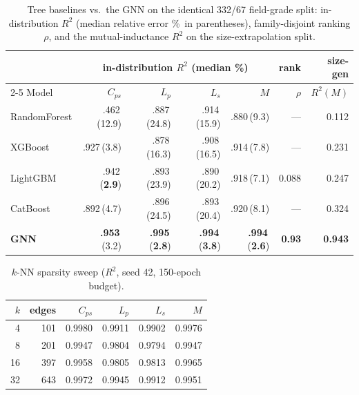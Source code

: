 \documentclass[letterpaper,twocolumn,9pt]{extarticle}
\begin{document}
\begin{table}[t]
\caption{Tree baselines vs.\ the GNN on the identical 332/67 field-grade split:
in-distribution $R^2$ (median relative error \%\ in parentheses), family-disjoint
ranking $\rho$, and the mutual-inductance $R^2$ on the size-extrapolation split.}
\label{tab:trees}
\centering
\footnotesize
\setlength{\tabcolsep}{3.5pt}
\begin{tabular}{lrrrr@{\ \ }rr}
\toprule
& \multicolumn{4}{c}{in-distribution $R^2$ (median \%)} & rank & size-gen\\
\cmidrule(lr){2-5}
Model & $C_{ps}$ & $L_{p}$ & $L_{s}$ & $M$ & $\rho$ & $R^2(M)$\\
\midrule
RandomForest & .462\,(12.9) & .887\,(24.8) & .914\,(15.9) & .880\,(9.3) & --- & 0.112\\
XGBoost      & .927\,(3.8)  & .878\,(16.3) & .908\,(16.5) & .914\,(7.8) & --- & 0.231\\
LightGBM     & .942\,(\textbf{2.9})  & .893\,(23.9) & .890\,(20.2) & .918\,(7.1) & 0.088 & 0.247\\
CatBoost     & .892\,(4.7)  & .896\,(24.5) & .893\,(20.4) & .920\,(8.1) & --- & 0.324\\
\midrule
\textbf{GNN} & \textbf{.953}\,(3.2) & \textbf{.995}\,(\textbf{2.8}) &
\textbf{.994}\,(\textbf{3.8}) & \textbf{.994}\,(\textbf{2.6}) &
\textbf{0.93} & \textbf{0.943}\\
\bottomrule
\end{tabular}
\end{table}

\begin{table}[t]
\caption{$k$-NN sparsity sweep ($R^2$, seed 42, 150-epoch budget).}
\label{tab:sweep}
\centering
\small
\begin{tabular}{rrrrrr@{\quad}}
\toprule
$k$ & edges & $C_{ps}$ & $L_{p}$ & $L_{s}$ & $M$\\
\midrule
4  & 101 & 0.9980 & 0.9911 & 0.9902 & 0.9976\\
8  & 201 & 0.9947 & 0.9804 & 0.9794 & 0.9947\\
16 & 397 & 0.9958 & 0.9805 & 0.9813 & 0.9965\\
32 & 643 & 0.9972 & 0.9945 & 0.9912 & 0.9951\\
\bottomrule
\end{tabular}
\end{table}
\end{document}
